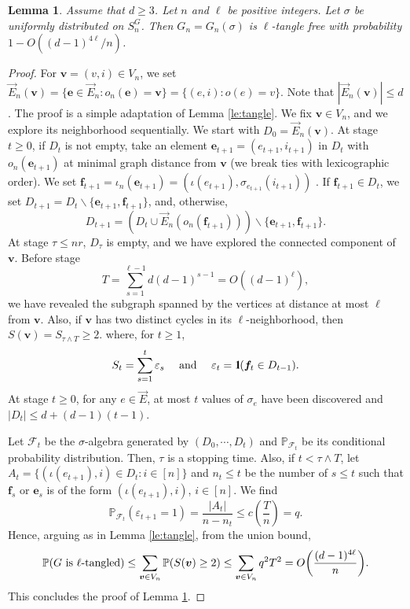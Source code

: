 \documentclass[11pt]{article}
\newtheorem{lemma}{Lemma}
\newcommand{\dP}{\mathbb{P}}
\newcommand{\cF}{\mathcal {F}}
\newcommand{\PAR}[1]{{{\left(#1\right)}}} %
\newcommand{\1}{1\!\!{\sf I}}\newcommand{\IND}{\1}
\newcommand{\veps}{\varepsilon}
\newcommand{\Be}{\bm{e}}
\newcommand{\Bf}{\bm{f}}
\begin{document}
\begin{lemma}\label{leM:tangle}
Assume that $d \geq 3$. Let $n$ and $\ell$ be positive integers. Let $\sigma$ be uniformly distributed on $S_n^G$. Then $G_n = G_n(\sigma)$ is $\ell$-tangle free with probability $1 - O ((d-1)^{4\ell} / n)$.
\end{lemma}


\begin{proof} For $\bm v = (v,i) \in V_n$, we set  $\vec E_n (\bm v) = \{  \Be \in \vec E_n : o_n (\Be ) = \bm v\} = \{ (e,i) : o(e) = v \}$. Note that $|\vec E_n(\bm v ) | \leq d$. The proof is a simple adaptation of Lemma \ref{le:tangle}. We fix $\bm v  \in V_n$, and we explore its neighborhood sequentially. We start with $D_0 = \vec E_n (\bm v) $.  At stage $t \geq 0$, if $D_t$ is not empty, take an element $\Be_{t+1}  = (e_{t+1},i_{t+1})$ in $D_t$ with $o_n(\Be_{t+1})$ at minimal graph distance  from $\bm v$ (we break ties with lexicographic order). We set $\Bf_{t+1} = \iota_n (\Be_{t+1}) = ( \iota(e_{t+1}) , \sigma_{e_{t+1}} (i_{t+1}))$ .  If  $\Bf_{t+1}  \in D_{t}$, we set $D_{t+1} = D_t \backslash \{ \Be_{t+1}, \Bf_{t+1} \}$, and, otherwise,  $$D_{t+1} =  \PAR{D_t \cup  \vec E_n( o_n(\Bf_{t+1} ))  } \backslash \{ \Be_{t+1} , \Bf_{t+1}\}.$$ 
At stage $\tau \leq n r$, $D_\tau$ is empty, and we have explored the connected component of $\bm v$. Before stage 
$$ T = \sum_{s = 1}^{\ell -1} d (d-1)^{s-1} = O \PAR{ (d-1)^\ell} ,$$
 we have revealed the subgraph spanned by the vertices at distance at most  $\ell$ from $\bm v$. Also, if $\bm v$ has two distinct cycles in its $\ell$-neighborhood, then
$
S(\bm v) = S_{\tau \wedge T}  \geq 2 . 
$
where, for $t \geq 1$,
$$
S_t =  \sum_{s= 1}^{t} \veps_{s} \quad   \hbox{ and } \quad \veps_t = \IND ( \Bf_{t} \in D_{t-1} ). 
$$
At stage $t \geq 0$, for any $e \in \vec E$, at most $t$ values of $\sigma_e$ have been discovered and $
|D_t | \leq d + (d-1)(t-1)$. 

Let $\cF_t$ be the $\sigma$-algebra generated by $(D_0, \cdots, D_{t})$ and $\dP_{\cF_t}$ be its conditional probability distribution. Then, $\tau$ is a stopping time. Also, if $t < \tau \wedge T$, let $A_t = \{ (\iota(e_{t+1}),i) \in D_t : i \in [n]\}$   and $n_t \leq t$ be the number of $s \leq t$ such that $\Bf_s$ or $\Be_s$ is of the form $(  \iota(e_{t+1}),i)$, $i \in [n]$. We find
$$
\dP_{\cF_t} ( \veps_{t+1} = 1) = \frac{|A_{t}|  }{n - n_t}   \leq c \PAR{ \frac{ T }{n} } = q. 
$$
Hence, arguing as in Lemma \ref{le:tangle}, from the union bound,  
$$
\dP \PAR{ G \hbox{ is $\ell$-tangled}}\leq \sum_{\bm v \in V_n}  \dP ( S(\bm v) \geq 2)  \leq \sum_{\bm v \in V_n} q^2 T^2   = O \PAR{ \frac{ (d-1)^{4 \ell}  }{n}}.
$$
This concludes the proof of Lemma \ref{leM:tangle}.  
\end{proof}
\end{document}
